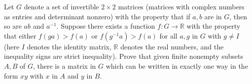 Let $G$ denote a set of invertible $2 \times 2$ matrices (matrices with complex
numbers as entries and determinant nonzero) with the property that if $a, b$
are in $G$, then so are $ab$ and $a^{-1}$. Suppose there exists a function $f :
G \to \mathbb{R}$ with the property that either $f(ga) > f(a)$ or
$f(g^{-1} a) > f(a)$ for all $a, g$ in $G$ with $g \ne I$ (here $I$ denotes the
identity matrix, $\mathbb{R}$ denotes the real numbers, and the inequality
signs are strict inequality). Prove that given finite nonempty subsets $A, B$
of $G$, there is a matrix in $G$ which can be written in exactly one way in the
form $xy$ with $x$ in $A$ and $y$ in $B$.
